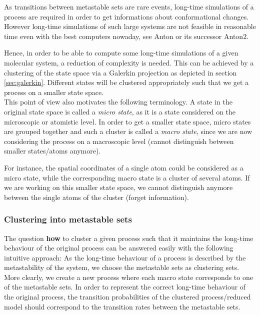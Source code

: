 As transitions between metastable sets are rare events, long-time simulations of a process are required in order to get informations about conformational changes.
However long-time simulations of such large systems are not feasible in reasonable time even with the best computers nowaday, see Anton\cite{shaw2009millisecond} or its successor Anton$2$\cite{shaw2014anton}.

Hence, in order to be able to compute some long-time simulations of a given molecular system, a reduction of complexity  is needed. This can be achieved by a clustering of the state space via a Galerkin projection as depicted in section \ref{sec:galerkin}. Different states will be clustered appropriately such that we get a process on a smaller state space.
\\

This point of view also motivates the following terminology. A state in the original state space is called a \textit{micro state}, as it is a state considered on the microscopic or atomistic level. In order to get a smaller state space, micro states are grouped together and such a cluster is called a \textit{macro state}, since we are now considering the process on a macroscopic level (cannot distinguish between smaller states/atoms anymore).

For instance, the spatial coordinates of a single atom could be considered as a micro state, while the corresponding macro state is a cluster of several atoms. If we are working on this smaller state space, we cannot distinguish anymore between the single atoms of the cluster (forget information).

\subsubsection*{Clustering into metastable sets}

The question \textbf{how} to cluster a given process such that it maintains the long-time behaviour of the original process can be answered easily with the following intuitive approach: As the long-time behaviour of a process is described by the metastability of the system, we choose the metastable sets as clustering sets.
More clearly, we create a new process where each macro state corresponds to one of the metastable sets.
In order to represent the correct long-time behaviour of the original process, the transition probabilities of the clustered process/reduced model should correspond to the transition rates between the metastable sets.
\\

